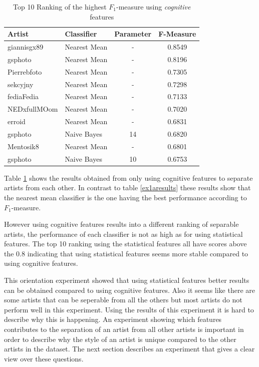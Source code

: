 \begin{table}
    \centering
    \begin{tabular}
        { | l | l | c | c } 
        \hline
        Artist & Classifier & Parameter & F-Measure \\
        \hline
        giannisgx89 & Nearest Mean & - & 0.8549 \\ 
        gsphoto & Nearest Mean & - & 0.8196 \\ 
        Pierrebfoto & Nearest Mean & - & 0.7305 \\ 
        sekcyjny & Nearest Mean & - & 0.7298 \\ 
        fediaFedia & Nearest Mean & - & 0.7133 \\
        NEDxfullMOom & Nearest Mean & - & 0.7020 \\
        erroid & Nearest Mean & - & 0.6831 \\
        gsphoto & Naive Bayes & 14 & 0.6820 \\
        Mentosik8 & Nearest Mean & - & 0.6801 \\
        gsphoto & Naive Bayes & 10 & 0.6753 \\
        \hline 
    \end{tabular}
    \caption{Top 10 Ranking of the highest $F_1$-measure using \textit{cognitive} features}
    \label{ex1bresults}
\end{table}

Table \ref{ex1bresults} shows the results obtained from only using cognitive features to separate artists from each other.
In contrast to table \ref{ex1aresults} these results show that the nearest mean classifier is the one having the best performance according to $F_1$-measure.

However using cognitive features results into a different ranking of separable artists, the performance of each classifier is not as high as for using statistical features.
The top 10 ranking using the statistical features all have scores above the 0.8 indicating that using statistical features seems more stable compared to using cognitive features.

This orientation experiment showed that using statistical features better results can be obtained compared to using cognitive features.
Also it seems like there are some artists that can be seperable from all the others but most artists do not perform well in this experiment.
Using the results of this experiment it is hard to describe why this is happening. 
An experiment showing which features contributes to the separation of an artist from all other artists is important in order to describe why the style of an artist is unique compared to the other artists in the dataset.
The next section describes an experiment that gives a clear view over these questions.

